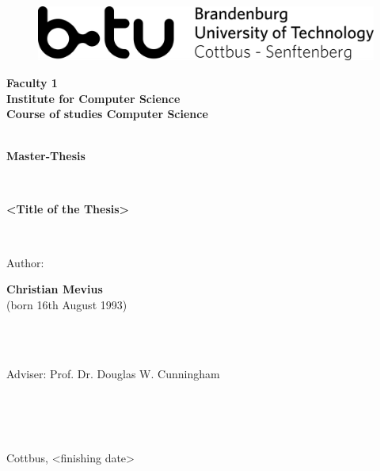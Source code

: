 \begin{titlepage}
	\begin{center}
		\ \\
	\begin{figure}[ht]
		\center\includegraphics[scale=2]{img/logo}
	\end{figure}
		\vfill
		\Large \textbf{Faculty 1 \\ Institute for Computer Science \\ Course of studies Computer Science}
		\ \\
		\ \\
		\vfill
		{\Huge \textbf{Master-Thesis} \par}	
		\ \\
		\vfill
		{\Large \textbf{<Title of the Thesis>}
		\par}
		\vfill
		\ \\
		\vfill
		{\normalsize{Author:}\par}

		{\Large \textbf{Christian Mevius} \ \\
						\normalsize{(born 16th August 1993)}
		\par}
		\ \\
		
		\ \\
	\end{center}
	\vfill	
	{\normalsize{Adviser: Prof. Dr. Douglas W. Cunningham}\par}
		\ \\
		\ \\
		\ \\
	{\normalsize{Cottbus, <finishing date>}\par}
\end{titlepage}